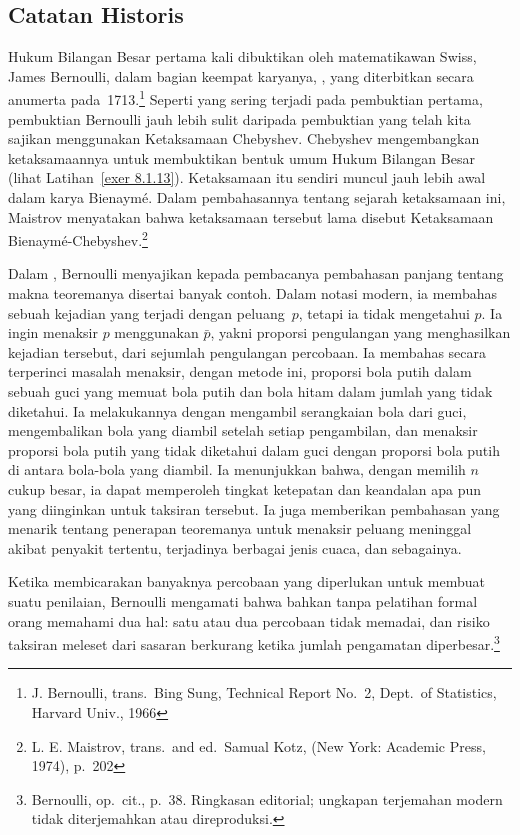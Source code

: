 \subsection*{Catatan Historis}
Hukum Bilangan Besar pertama kali dibuktikan oleh matematikawan Swiss, James
Bernoulli, dalam bagian keempat karyanya, , yang diterbitkan
secara anumerta pada~1713.\footnote{J. Bernoulli,  trans.~Bing Sung, Technical Report No.~2, Dept.\ of Statistics, Harvard
Univ., 1966}  Seperti yang sering terjadi pada pembuktian pertama, pembuktian Bernoulli jauh
lebih sulit daripada pembuktian yang telah kita sajikan menggunakan Ketaksamaan Chebyshev. 
Chebyshev mengembangkan ketaksamaannya untuk membuktikan bentuk umum Hukum Bilangan
Besar (lihat Latihan~\ref{exer 8.1.13}).  Ketaksamaan itu sendiri muncul
jauh lebih awal dalam karya Bienaym\'e. Dalam pembahasannya tentang sejarah ketaksamaan ini,
Maistrov menyatakan bahwa ketaksamaan tersebut lama disebut Ketaksamaan
Bienaym\'e-Chebyshev.\footnote{L. E. Maistrov,  trans.\ and ed.~Samual Kotz, (New York: Academic Press, 1974),
p.~202}

Dalam , Bernoulli menyajikan kepada pembacanya pembahasan panjang
tentang makna teoremanya disertai banyak contoh.  Dalam notasi modern, ia membahas
sebuah kejadian yang terjadi dengan peluang~$p$, tetapi ia tidak mengetahui $p$.  Ia ingin
menaksir $p$ menggunakan $\bar{p}$, yakni proporsi pengulangan yang menghasilkan kejadian tersebut,
dari sejumlah pengulangan percobaan.  Ia membahas secara terperinci
masalah menaksir, dengan metode ini, proporsi bola putih dalam sebuah guci
yang memuat bola putih dan bola hitam dalam jumlah yang tidak diketahui.  Ia melakukannya dengan
mengambil serangkaian bola dari guci, mengembalikan bola yang diambil setelah setiap
pengambilan, dan menaksir proporsi bola putih yang tidak diketahui dalam guci dengan
proporsi bola putih di antara bola-bola yang diambil.  Ia menunjukkan bahwa, dengan memilih $n$
cukup besar, ia dapat memperoleh tingkat ketepatan dan keandalan apa pun yang diinginkan untuk
taksiran tersebut.  Ia juga memberikan pembahasan yang menarik tentang penerapan
teoremanya untuk menaksir peluang meninggal akibat penyakit tertentu,
terjadinya berbagai jenis cuaca, dan sebagainya.

Ketika membicarakan banyaknya percobaan yang diperlukan untuk membuat suatu penilaian, Bernoulli
mengamati bahwa bahkan tanpa pelatihan formal orang memahami dua hal: satu atau dua percobaan
tidak memadai, dan risiko taksiran meleset dari sasaran berkurang ketika jumlah pengamatan
diperbesar.\footnote{Bernoulli, op.\ cit., p.~38. Ringkasan editorial; ungkapan terjemahan
modern tidak diterjemahkan atau direproduksi.}


